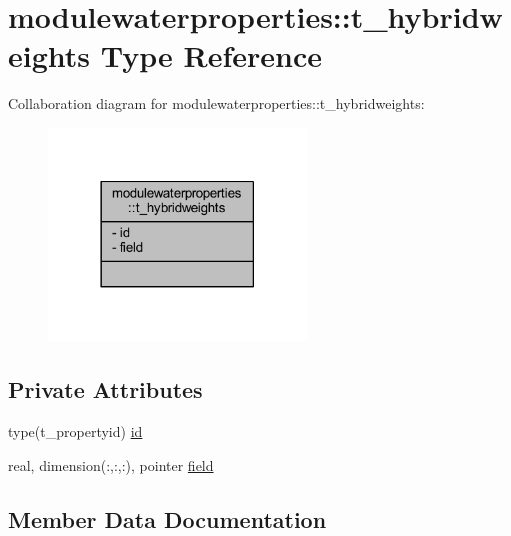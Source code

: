\hypertarget{structmodulewaterproperties_1_1t__hybridweights}{}\section{modulewaterproperties\+:\+:t\+\_\+hybridweights Type Reference}
\label{structmodulewaterproperties_1_1t__hybridweights}


Collaboration diagram for modulewaterproperties\+:\+:t\+\_\+hybridweights\+:\nopagebreak
\begin{figure}[H]
\begin{center}
\leavevmode
\includegraphics[width=194pt]{structmodulewaterproperties_1_1t__hybridweights__coll__graph}
\end{center}
\end{figure}
\subsection*{Private Attributes}
\begin{DoxyCompactItemize}
\item 
type(t\+\_\+propertyid) \mbox{\hyperlink{structmodulewaterproperties_1_1t__hybridweights_ae0583eb35c55b8effec392e96a73eb9c}{id}}
\item 
real, dimension(\+:,\+:,\+:), pointer \mbox{\hyperlink{structmodulewaterproperties_1_1t__hybridweights_a3d359fe116a187933eb6f584e21a4252}{field}}
\end{DoxyCompactItemize}


\subsection{Member Data Documentation}
\mbox{\label{structmodulewaterproperties_1_1t__hybridweights_a3d359fe116a187933eb6f584e21a4252}} 
